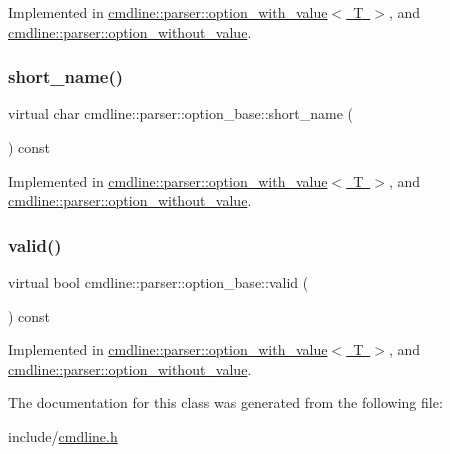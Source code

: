 Implemented in \mbox{\hyperlink{classcmdline_1_1parser_1_1option__with__value_a7ea043466b20ee712439276b8ba888f3}{cmdline\+::parser\+::option\+\_\+with\+\_\+value$<$ T $>$}}, and \mbox{\hyperlink{classcmdline_1_1parser_1_1option__without__value_a094839df784a0f6a5044ec42d682f845}{cmdline\+::parser\+::option\+\_\+without\+\_\+value}}.

\mbox{\label{classcmdline_1_1parser_1_1option__base_aeea790198b8097ccb98a5a9063d3c81f}} 
\subsubsection{\texorpdfstring{short\_name()}{short\_name()}}
{\footnotesize\ttfamily virtual char cmdline\+::parser\+::option\+\_\+base\+::short\+\_\+name (\begin{DoxyParamCaption}{ }\end{DoxyParamCaption}) const\hspace{0.3cm}{\ttfamily [pure virtual]}}



Implemented in \mbox{\hyperlink{classcmdline_1_1parser_1_1option__with__value_a2ebacba0864e4473cefc8a4a967f4ab1}{cmdline\+::parser\+::option\+\_\+with\+\_\+value$<$ T $>$}}, and \mbox{\hyperlink{classcmdline_1_1parser_1_1option__without__value_a6a4f9070fc44c46584515ad0a72a75af}{cmdline\+::parser\+::option\+\_\+without\+\_\+value}}.

\mbox{\label{classcmdline_1_1parser_1_1option__base_ae0f802a846608195166bc5ad925462e2}} 
\subsubsection{\texorpdfstring{valid()}{valid()}}
{\footnotesize\ttfamily virtual bool cmdline\+::parser\+::option\+\_\+base\+::valid (\begin{DoxyParamCaption}{ }\end{DoxyParamCaption}) const\hspace{0.3cm}{\ttfamily [pure virtual]}}



Implemented in \mbox{\hyperlink{classcmdline_1_1parser_1_1option__with__value_aae5ed5d511506ab324d203d31abb4a28}{cmdline\+::parser\+::option\+\_\+with\+\_\+value$<$ T $>$}}, and \mbox{\hyperlink{classcmdline_1_1parser_1_1option__without__value_ad1dd50b3fd7c7020d817d1e173240ba3}{cmdline\+::parser\+::option\+\_\+without\+\_\+value}}.



The documentation for this class was generated from the following file\+:\begin{DoxyCompactItemize}
\item 
include/\mbox{\hyperlink{cmdline_8h}{cmdline.\+h}}\end{DoxyCompactItemize}
